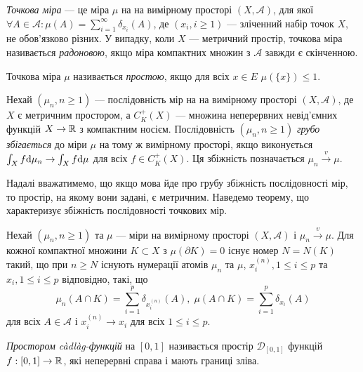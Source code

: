 \begin{definition}
    \emph{Точкова міра} --- це міра $\mu$ на 
    на вимірному просторі $\left(X, \mathcal{A}\right)$,
    для якої $\forall A \in \mathcal{A}: \mu(A) = \sum_{i=1}^{\infty} \delta_{x_i}(A)$,
    де $\left(x_i, i \geq 1\right)$ --- зліченний набір точок $X$, не обов'язково різних.
    У випадку, коли $X$ --- метричний простір, точкова міра називається \emph{радоновою},
    якщо міра компактних множин з $\mathcal{A}$ завжди є скінченною.
\end{definition}
\begin{definition}
    Точкова міра $\mu$ називається \emph{простою},
    якщо для всіх $x \in E$ $\mu\left(\{x\}\right) \leq 1$.
\end{definition}
\begin{definition}
    Нехай $\left(\mu_n, n \geq 1\right)$ --- послідовність мір на
    на вимірному просторі $\left(X, \mathcal{A}\right)$,
    де $X$ є метричним простором,
    а $C_K^+(X)$ --- множина неперервних невід'ємних функцій
    $X \to \mathbb{R}$ з компактним носієм.
    Послідовність $\left(\mu_n, n \geq 1\right)$
    \emph{грубо збігається} до міри $\mu$ на тому ж вимірному просторі,
    якщо виконується $\int_X f \mathrm{d}\mu_n \to \int_X f \mathrm{d}\mu$ для всіх $f \in C_K^+(X)$.
    Ця збіжність позначається $\mu_n \overset{v}{\longrightarrow} \mu$.
\end{definition}

Надалі вважатимемо, що якщо мова йде про
грубу збіжність послідовності мір, то простір, на якому вони задані,
є метричним.
Наведемо теорему, що характеризує збіжність послідовності точкових мір.
\begin{theorem}\label{th:point_mes_conv}
    Нехай $\left(\mu_n, n \geq 1\right)$ та $\mu$ --- міри
    на вимірному просторі $\left(X, \mathcal{A}\right)$ і
    $\mu_n \overset{v}{\longrightarrow} \mu$. Для кожної компактної множини
    $K \subset X$ з $\mu(\partial K) = 0$ існує номер $N = N(K)$ такий,
    що при $n \geq N$ існують нумерації атомів $\mu_n$ та 
    $\mu$, $x_i^{(n)}, 1 \leq i \leq p$ та $x_i, 1 \leq i \leq p$ відповідно, такі, що
    $$
        \mu_n(A \cap K) = \sum_{i=1}^p \delta_{x_i^{(n)}} (A), \;
        \mu(A \cap K) = \sum_{i=1}^p \delta_{x_i} (A)
    $$
    для всіх $A \in \mathcal{A}$ і $x_i^{(n)} \to x_i$ для всіх $1 \leq i \leq p$.
\end{theorem}

\begin{definition}
    \emph{Простором càdlàg-функцій} на $[0, 1]$ називається простір $\mathcal{D}_{[0, 1]}$
    функцій $f : [0, 1] \to \mathbb{R}$, які неперервні справа і мають границі зліва.
\end{definition}

